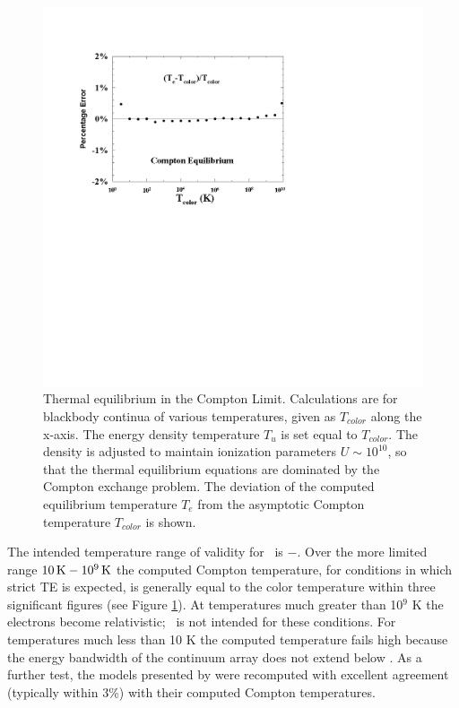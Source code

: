 \begin{figure}
\centering
\label{fig:ComptonEquilibriumError}
\includegraphics[scale=0.7]{ComptonEquilibriumError}
\caption[Compton Equilibrium Error]{Thermal equilibrium in the Compton Limit. Calculations are for
blackbody continua of various temperatures, given as $T_{color}$ along the x-axis.
The energy density temperature $T_u$ is set equal to $T_{color}$.  The density is
adjusted to maintain ionization parameters $U\sim  10^{10}$, so that the thermal
equilibrium equations are dominated by the Compton exchange problem.  The
deviation of the computed equilibrium temperature $T_e$ from the asymptotic
Compton temperature $T_{color}$ is shown.}
\end{figure}

The intended temperature range of validity for \Cloudy\ is \TempLimitLow $ -$\TempLimitHigh.  Over the more limited range $10 {\rm\thinspace K} - 10^9 {\rm\thinspace K}$ the computed Compton
 temperature, for conditions in which strict TE is expected, is generally
equal to the color temperature within three significant figures
(see Figure \ref{fig:ComptonEquilibriumError}).
At temperatures much greater than 10$^9$ K the electrons become
relativistic; \Cloudy\ is not intended for these conditions.  For temperatures
much less than 10 K the computed temperature fails high because the energy
bandwidth of the continuum array does not extend
below \emm .
As
a further test, the models presented by \citep{Krolik1981}
were recomputed with excellent agreement (typically within 3\%) with their
computed Compton temperatures.

